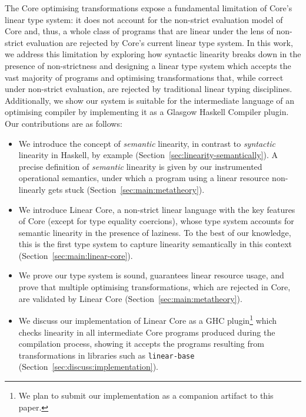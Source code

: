 \documentclass[acmsmall,review,anonymous,screen]{acmart}
\begin{document}

The Core optimising transformations expose a fundamental limitation of Core's
linear type system: it does not account for the non-strict evaluation model
of Core and, thus, a whole class of programs that are linear under the lens of
non-strict evaluation are rejected by Core's current linear type system.
%
In this work, we address this limitation by exploring how syntactic linearity
breaks down in the presence of non-strictness and designing a linear type
system which accepts the vast majority of programs and optimising
transformations that, while correct under non-strict evaluation, are rejected
by traditional linear typing disciplines.
%
%
Additionally, we show our system
%
is suitable for the intermediate language of an
optimising compiler by implementing it as a Glasgow Haskell Compiler plugin.
%
Our contributions are as follows:
%
\begin{itemize}

\item We introduce the concept of \emph{semantic} linearity, in
contrast to \emph{syntactic} linearity in Haskell, by example
(Section~\ref{sec:linearity-semantically}).
%
A precise definition of \emph{semantic} linearity is given by our instrumented
operational semantics, under which a program using a linear resource
non-linearly gets stuck (Section~\ref{sec:main:metatheory}).

\item We introduce Linear Core, a non-strict linear language with
the key features of Core (except for type equality coercions), whose type system
accounts for semantic linearity in the presence of laziness. To the
best of our knowledge, this is the first type system to capture linearity
semantically in this context (Section~\ref{sec:main:linear-core}).

\item We prove our type system is sound, guarantees linear resource usage, and
    prove that multiple optimising transformations, which are rejected in Core,
        are validated by Linear Core (Section~\ref{sec:main:metatheory}).

\item We discuss our implementation of Linear Core as a GHC
  plugin\footnote{We plan to submit our implementation as a companion
    artifact to this paper.} which checks linearity in
all intermediate Core programs produced during the compilation process, showing
it accepts the programs resulting from transformations in libraries such as
\texttt{linear-base} (Section~\ref{sec:discuss:implementation}).

\end{itemize}
\end{document}
